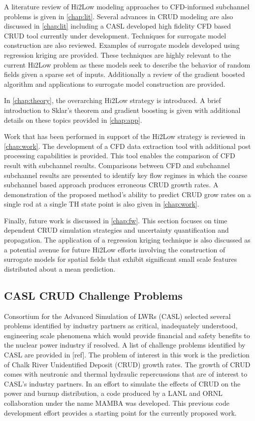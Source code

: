 A literature review of Hi2Low modeling approaches to CFD-informed subchannel
problems is given in \autoref{chap:lit}.  Several advances in CRUD modeling are
also discussed in \autoref{chap:lit} including a CASL developed high fidelity
CFD based CRUD tool currently under development.  Techniques for surrogate
model construction are also reviewed.  Examples of surrogate models developed
using regression kriging are provided.  These techniques are highly relevant to
the current Hi2Low problem as these models seek to describe the behavior of
random fields given a sparse set of inputs.  Additionally a review of the
gradient boosted algorithm and applications to surrogate model construction are
provided.

In \autoref{chap:theory}, the overarching Hi2Low strategy is introduced.  A
brief introduction to Sklar's theorem and gradient boosting is given with
additional details on these topics provided in \autoref{chap:app}.

Work that has been performed in support of the Hi2Low strategy is reviewed in
\autoref{chap:work}.  The development of a CFD data extraction tool with
additional post processing capabilities is provided.  This tool enables the
comparison of CFD result with subchannel results.  Comparisons between CFD and
subchannel subchannel results are presented to identify key flow regimes in
which the coarse subchannel based approach produces erroneous CRUD growth
rates.  A demonstration of the proposed method's ability to predict CRUD grow
rates on a single rod at a single TH state point is also given in
\autoref{chap:work}.

Finally, future work is discussed in \autoref{chap:fw}.  This section
focuses on time dependent CRUD simulation strategies and uncertainty
quantification and propagation.  The application of a regression kriging
technique is also discussed as a potential avenue for future Hi2Low efforts
involving the construction of surrogate models for spatial fields that exhibit
significant small scale features distributed about a mean prediction.

\subsection{CASL CRUD Challenge Problems}

Consortium for the Advanced Simulation of LWRs (CASL) selected several problems identified by industry partners as critical, inadequately understood, engineering scale phenomena which would provide
financial and safety benefits to the nuclear power industry if resolved.  A
list of challenge problems identified by CASL are provided in [ref].  The problem of
interest in this work is the prediction of Chalk River Unidentified Deposit
(CRUD) growth rates.  The growth of CRUD comes with neutronic and thermal
hydraulic repercussions that are of interest to CASL's industry partners.
In an effort to simulate the
effects of CRUD on the power and burnup distribution, a code produced by a LANL
and ORNL collaboration \cite{collins16} under the name MAMBA was developed.
This previous code development effort provides a starting point for the currently proposed work.

